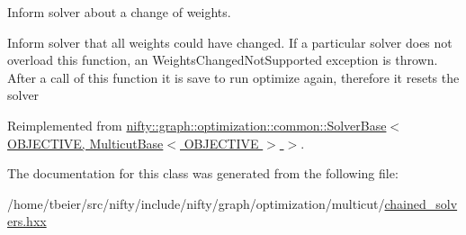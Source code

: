 Inform solver about a change of weights. 

Inform solver that all weights could have changed. If a particular solver does not overload this function, an Weights\+Changed\+Not\+Supported exception is thrown. After a call of this function it is save to run optimize again, therefore it resets the solver 

Reimplemented from \hyperlink{classnifty_1_1graph_1_1optimization_1_1common_1_1SolverBase_a8ab38d61068370e24cca475ef1b5d8b1}{nifty\+::graph\+::optimization\+::common\+::\+Solver\+Base$<$ O\+B\+J\+E\+C\+T\+I\+V\+E, Multicut\+Base$<$ O\+B\+J\+E\+C\+T\+I\+V\+E $>$ $>$}.



The documentation for this class was generated from the following file\+:\begin{DoxyCompactItemize}
\item 
/home/tbeier/src/nifty/include/nifty/graph/optimization/multicut/\hyperlink{chained__solvers_8hxx}{chained\+\_\+solvers.\+hxx}\end{DoxyCompactItemize}
